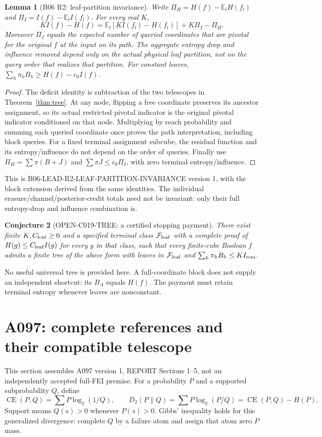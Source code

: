\documentclass[11pt]{article}
\newtheorem{lemma}{Lemma}
\newtheorem{conjecture}[lemma]{Conjecture}
\newcommand{\E}{\mathbb E}
\newcommand{\KL}{D_2}
\newcommand{\CE}{\operatorname{CE}}
\begin{document}
\begin{lemma}[B06 R2: leaf-partition invariance]
\label{lem:r2}
Write $\Pi_H=H(f)-\E_lH(f_l)$ and
$\Pi_I=I(f)-\E_lI(f_l)$. For every real $K$,
\[
KI(f)-H(f)=\E_l[KI(f_l)-H(f_l)]+K\Pi_I-\Pi_H.
\]
Moreover $\Pi_I$ equals the expected number of queried coordinates
that are pivotal for the original $f$ at the input on its path.
The aggregate entropy drop and influence removed depend only on
the actual physical leaf partition, not on the query order that
realizes that partition. For constant leaves,
$\sum_h\pi_hB_h\ge H(f)-c_0I(f)$.
\end{lemma}
\begin{proof}
The deficit identity is subtraction of the two telescopes in
Theorem~\ref{thm:tree}. At any node, flipping a free coordinate
preserves its ancestor assignment, so its actual restricted pivotal
indicator is the original pivotal indicator conditioned on that
node. Multiplying by reach probability and summing each queried
coordinate once proves the path interpretation, including block
queries. For a fixed terminal assignment subcube, the residual
function and its entropy/influence do not depend on the order of
queries. Finally use $\Pi_H=\sum\pi(B+J)$ and
$\sum\pi J\le c_0\Pi_I$, with zero terminal entropy/influence.
\end{proof}
This is B06-LEAD-R2-LEAF-PARTITION-INVARIANCE version 1,
with the block extension derived from the same identities.
The individual erasure/channel/posterior-credit totals need not be
invariant: only their full entropy-drop and influence combination is.

\begin{conjecture}[OPEN-C019-TREE: a certified stopping payment]
\label{conj:tree}
There exist finite $K,C_{\rm leaf}\ge0$ and a specified terminal
class $\mathcal F_{\rm leaf}$ with a complete proof of
$H(g)\le C_{\rm leaf}I(g)$ for every $g$ in that class,
such that every finite-cube Boolean $f$ admits a finite tree of the
above form with leaves in $\mathcal F_{\rm leaf}$ and
$\sum_h\pi_hB_h\le KI_{\rm rem}$.
\end{conjecture}
No useful universal tree is provided here. A full-coordinate block
does not supply an independent shortcut: its $B_A$ equals $H(f)$.
The payment must retain terminal entropy whenever leaves are nonconstant.

\section{A097: complete references and their compatible telescope}
This section assembles A097 version 1, REPORT Sections 1--5,
not an independently accepted full-FEI premise.
For a probability $P$ and a supported subprobability $Q$, define
\[
\CE(P,Q)=\sum P\log_2(1/Q),\qquad
\KL(P\|Q)=\sum P\log_2(P/Q)=\CE(P,Q)-H(P).
\]
Support means $Q(s)>0$ whenever $P(s)>0$. Gibbs' inequality holds
for this generalized divergence: complete $Q$ by a failure atom
and assign that atom zero $P$ mass.
\end{document}
